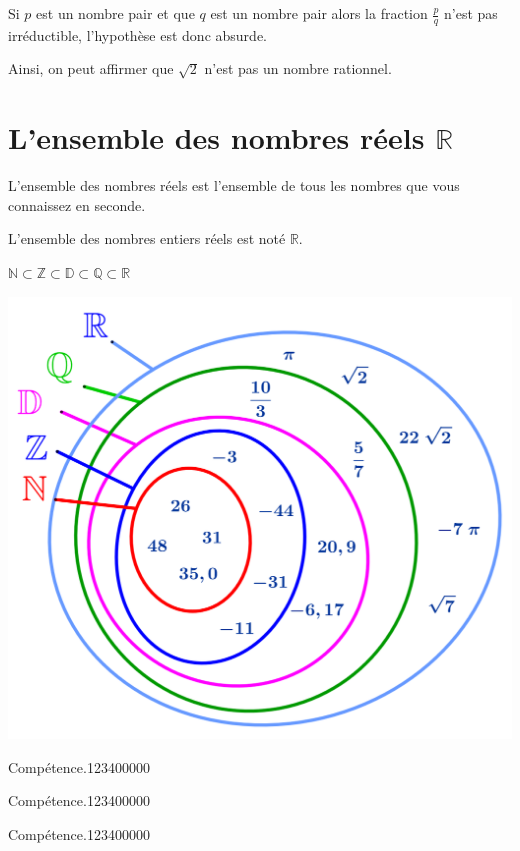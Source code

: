 \begin{pageCours}
{\begin{Pv}
Si $p$ est un nombre pair et que $q$ est un nombre pair alors la fraction $\frac{p}{q}$ n'est pas irréductible, l'hypothèse est donc absurde.

Ainsi, on peut affirmer que $\sqrt{2}$ n'est pas un nombre rationnel.
\end{Pv}
}

\section{L'ensemble des nombres réels $\mathbb{R}$}

\begin{Def}
L'ensemble des nombres réels est l'ensemble de tous les nombres que vous connaissez en seconde.

L'ensemble des nombres entiers réels est noté $\mathbb{R}$.
\end{Def}

\begin{Rq}
$\mathbb{N}\subset\mathbb{Z}\subset\mathbb{D}\subset\mathbb{Q}\subset\mathbb{R}$
\end{Rq}

\begin{center}
\includegraphics[width=.4\linewidth]{FIG/ensemble_de_nmbres.png} 
\end{center}

\end{pageCours} %


\begin{pageAD}  %
\restoregeometry %


\begin{ExoCad}{Compétence.}{1234}{0}{0}{0}{0}{0}

\end{ExoCad}


\begin{ExoCad}{Compétence.}{1234}{0}{0}{0}{0}{0}

\end{ExoCad}


\begin{ExoCad}{Compétence.}{1234}{0}{0}{0}{0}{0}

\end{ExoCad}
 
\end{pageAD} %

